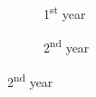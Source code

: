 \begin{figure}[ht]
    \begin{subfigure}{0.50\textwidth}
        \caption{1\textsuperscript{st} year} 
        \label{fig:JetUML_V3S1}
    \end{subfigure}\hspace*{\fill}
    \begin{subfigure}{0.50\textwidth}
        \caption{2\textsuperscript{nd} year} 
        \label{fig:JetUML_V3S2}
    \end{subfigure}
    

\end{figure}
